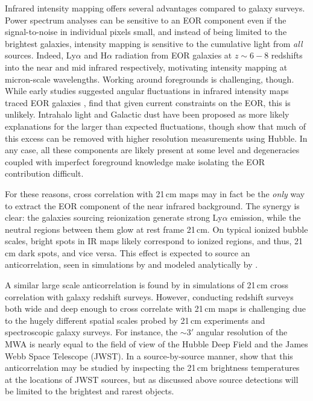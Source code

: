\documentclass{emulateapj}
\begin{document}
Infrared intensity mapping offers several advantages compared to galaxy surveys. Power spectrum analyses can be sensitive to an EOR component even if the signal-to-noise in individual pixels small, and instead of being limited to the brightest galaxies, intensity mapping is sensitive to the cumulative light from \textit{all} sources. Indeed, Ly$\alpha$ and H$\alpha$ radiation from EOR galaxies at $z\sim6-8$ redshifts into the near and mid infrared respectively, motivating intensity mapping at micron-scale wavelengths. Working around foregrounds is challenging, though. While early studies suggested angular fluctuations in infrared intensity maps traced EOR galaxies \citep[e.g.,][]{kash1,kash2,kash3}, \citet{kash4} find that given current constraints on the EOR, this is unlikely. Intrahalo light \citet{cooray12,zemcov14} and Galactic dust \citet{yue16} have been proposed as more likely explanations for the larger than expected fluctuations, though \citet{mw15} show that much of this excess can be removed with higher resolution measurements using Hubble. In any case, all these components are likely present at some level and degeneracies coupled with imperfect foreground knowledge make isolating the EOR contribution difficult.

For these reasons, cross correlation with 21\,cm maps may in fact be the \textit{only} way to extract the EOR component of the near infrared background. The synergy is clear: the galaxies sourcing reionization generate strong Ly$\alpha$ emission, while the neutral regions between them glow at rest frame 21\,cm. On typical ionized bubble scales, bright spots in IR maps likely correspond to ionized regions, and thus, 21\,cm dark spots, and vice versa. This effect is expected to source an anticorrelation, seen in simulations by \citet{silva12,Heneka2016} and modeled analytically by \citet{feng17,mao14}.

A similar large scale anticorrelation is found by \citet{lidz09,park14} in simulations of 21\,cm cross correlation with galaxy redshift surveys. However, conducting redshift surveys both wide and deep enough to cross correlate with 21\,cm maps is challenging due to the hugely different spatial scales probed by 21\,cm experiments and spectroscopic galaxy surveys. For instance, the $\sim3'$ angular resolution of the MWA is nearly equal to the field of view of the Hubble Deep Field and the James Webb Space Telescope (JWST). In a source-by-source manner, \citep{beardsley15} show that this anticorrelation may be studied by inspecting the 21\,cm brightness temperatures at the locations of JWST sources, but as discussed above source detections will be limited to the brightest and rarest objects.
\end{document}

